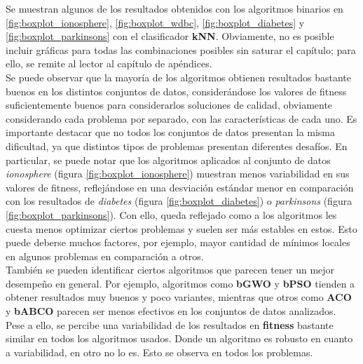 Se muestran algunos de los resultados obtenidos con los algoritmos binarios en \ref{fig:boxplot_ionosphere}, \ref{fig:boxplot_wdbc}, \ref{fig:boxplot_diabetes} y \ref{fig:boxplot_parkinsons} con el clasificador \textbf{kNN}. Obviamente, no es posible incluir gráficas para todas las combinaciones posibles sin saturar el capítulo; para ello, se remite al lector al capítulo de apéndices.\\[6pt]
Se puede observar que la mayoría de los algoritmos obtienen resultados bastante buenos en los distintos conjuntos de datos, considerándose los valores de fitness suficientemente buenos para considerarlos soluciones de calidad, obviamente considerando cada problema por separado, con las características de cada uno. Es importante destacar que no todos los conjuntos de datos presentan la misma dificultad, ya que distintos tipos de problemas presentan diferentes desafíos. En particular, se puede notar que los algoritmos aplicados al conjunto de datos \textit{ionosphere} (figura \ref{fig:boxplot_ionosphere}) muestran menos variabilidad en sus valores de fitness, reflejándose en una desviación estándar menor en comparación con los resultados de \textit{diabetes} (figura \ref{fig:boxplot_diabetes}) o \textit{parkinsons} (figura \ref{fig:boxplot_parkinsons}). Con ello, queda reflejado como a los algoritmos les cuesta menos optimizar ciertos problemas y suelen ser más estables en estos. Esto puede deberse muchos factores, por ejemplo, mayor cantidad de mínimos locales en algunos problemas en comparación a otros.\\[6pt]
También se pueden identificar ciertos algoritmos que parecen tener un mejor desempeño en general. Por ejemplo, algoritmos como \textbf{bGWO} y \textbf{bPSO} tienden a obtener resultados muy buenos y poco variantes, mientras que otros como \textbf{ACO} y \textbf{bABCO} parecen ser menos efectivos en los conjuntos de datos analizados.\\[6pt]
Pese a ello, se percibe una variabilidad de los resultados en \textbf{fitness} bastante similar en todos los algoritmos usados. Donde un algoritmo es robusto en cuanto a variabilidad, en otro no lo es. Esto se observa en todos los problemas.

